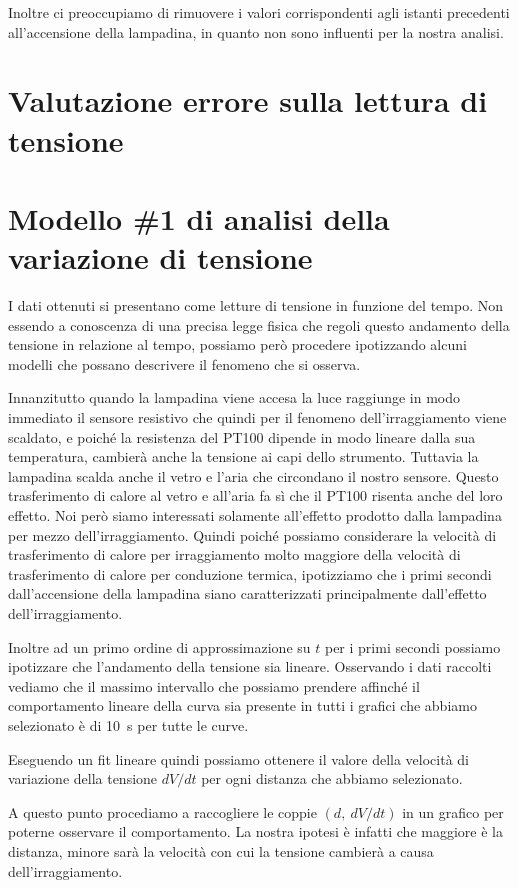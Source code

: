 \documentclass[
    rmp,
    reprint, 
    superscriptaddress, 
    altaffilletter, 
    amsmath, 
    amssymb,
    a4paper]{revtex4-2}
\begin{document}
Inoltre ci preoccupiamo di rimuovere i valori corrispondenti agli istanti precedenti all'accensione della lampadina, in quanto non sono influenti per la nostra analisi.

\section*{Valutazione errore sulla lettura di tensione}

\section*{Modello \#1 di analisi della variazione di tensione}
I dati ottenuti si presentano come letture di tensione in funzione del tempo. Non essendo a conoscenza di una precisa legge fisica che regoli questo andamento della tensione in relazione al tempo, possiamo però procedere ipotizzando alcuni modelli che possano descrivere il fenomeno che si osserva. 

Innanzitutto quando la lampadina viene accesa la luce raggiunge in modo immediato il sensore resistivo che quindi per il fenomeno dell'irraggiamento viene scaldato, e poiché la resistenza del PT100 dipende in modo lineare dalla sua temperatura, cambierà anche la tensione ai capi dello strumento. Tuttavia la lampadina scalda anche il vetro e l'aria che circondano il nostro sensore. Questo trasferimento di calore al vetro e all'aria fa sì che il PT100 risenta anche del loro effetto. Noi però siamo interessati solamente all'effetto prodotto dalla lampadina per mezzo dell'irraggiamento. Quindi poiché possiamo considerare la velocità di trasferimento di calore per irraggiamento molto maggiore della velocità di trasferimento di calore per conduzione termica, ipotizziamo che i primi secondi dall'accensione della lampadina siano caratterizzati principalmente dall'effetto dell'irraggiamento. 

Inoltre ad un primo ordine di approssimazione su $t$ per i primi secondi possiamo ipotizzare che l'andamento della tensione sia lineare. Osservando i dati raccolti vediamo che il massimo intervallo che possiamo prendere affinché il comportamento lineare della curva sia presente in tutti i grafici che abbiamo selezionato è di \SI{10}{\second} per tutte le curve. 

Eseguendo un fit lineare quindi possiamo ottenere il valore della velocità di variazione della tensione $dV/dt$ per ogni distanza che abbiamo selezionato.

A questo punto procediamo a raccogliere le coppie $(d,~dV/dt)$ in un grafico per poterne osservare il comportamento. 
La nostra ipotesi è infatti che maggiore è la distanza, minore sarà la velocità con cui la tensione cambierà a causa dell'irraggiamento. 
\end{document}
